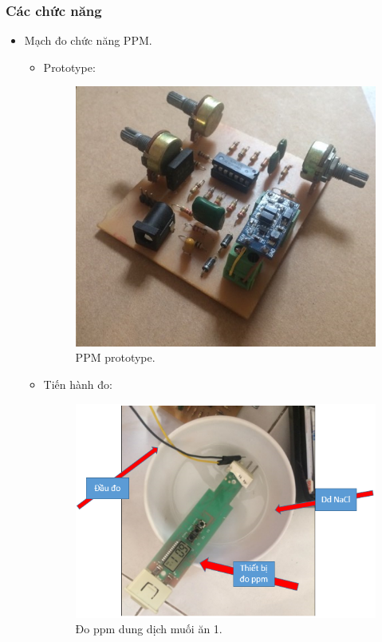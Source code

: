 \documentclass[a4paper,12pt,oneside]{article}
\begin{document}
\subsubsection{Các chức năng}
\begin{itemize}
	\item Mạch đo chức năng PPM.
		\begin{itemize}
\item Prototype:
	\begin{figure}[H]
	\centering
	\includegraphics[scale=.6]{hinh/PPM/prototype_ppm.jpg}
	\caption{PPM prototype.}
	\end{figure}
\item Tiến hành đo:
	\begin{figure}[H]
	\centering
	\includegraphics[scale=.7]{hinh/PPM/nacl_1.PNG}
	\caption{Đo ppm dung dịch muối ăn 1.}
	\end{figure}
	

\end{itemize}
\end{itemize}
\end{document}
